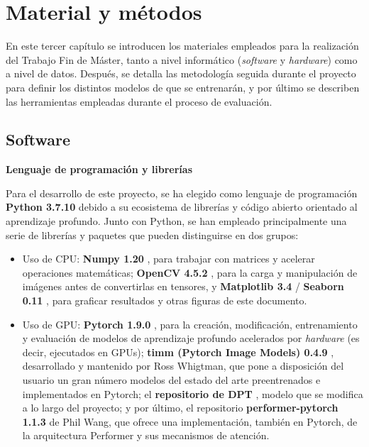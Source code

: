 \section{Material y métodos}

En este tercer capítulo se introducen los materiales empleados para la realización del Trabajo Fin de Máster, tanto a nivel informático (\textit{software} y \textit{hardware}) como a nivel de datos. Después, se detalla las metodología seguida durante el proyecto para definir los distintos modelos de que se entrenarán, y por último se describen las herramientas empleadas durante el proceso de evaluación.

\subsection{Software}

\textbf{Lenguaje de programación y librerías}

Para el desarrollo de este proyecto, se ha elegido como lenguaje de programación \textbf{Python 3.7.10} debido a su ecosistema de librerías y código abierto orientado al aprendizaje profundo. Junto con Python, se han empleado principalmente una serie de librerías y paquetes que pueden distinguirse en dos grupos: 
\begin{itemize}
\item Uso de CPU: \textbf{Numpy 1.20} \cite{numpy}, para trabajar con matrices y acelerar operaciones matemáticas; \textbf{OpenCV 4.5.2} \cite{opencv_library}, para la carga y manipulación de imágenes antes de convertirlas en tensores, y \textbf{Matplotlib 3.4} \cite{matplotlib} / \textbf{Seaborn 0.11} \cite{seaborn}, para graficar resultados y otras figuras de este documento.
\item Uso de GPU: \textbf{Pytorch 1.9.0} \cite{pytorch}, para la creación, modificación, entrenamiento y evaluación de modelos de aprendizaje profundo acelerados por \textit{hardware} (es decir, ejecutados en GPUs); \textbf{timm (Pytorch Image Models) 0.4.9} \cite{timm}, desarrollado y mantenido por Ross Whigtman, que pone a disposición del usuario un gran número modelos del estado del arte preentrenados e implementados en Pytorch; el \textbf{repositorio de DPT} \cite{visiontransformersDPT}, modelo que se modifica a lo largo del proyecto; y por último, el repositorio \textbf{performer-pytorch 1.1.3} \cite{pwperformer} de Phil Wang, que ofrece una implementación, también en Pytorch, de la arquitectura Performer y sus mecanismos de atención.
\end{itemize}

